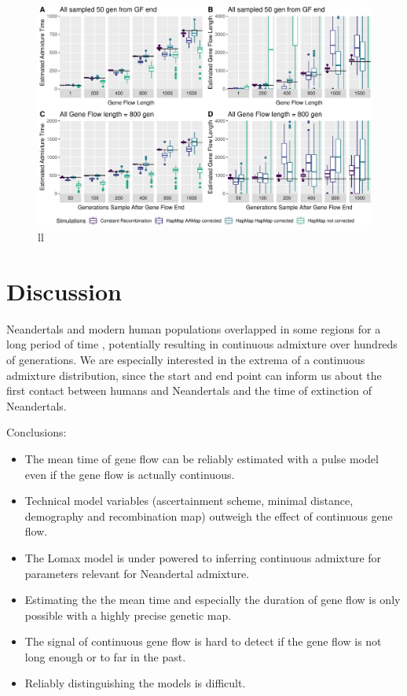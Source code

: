 \documentclass[]{article}
\begin{document}
\begin{figure}
\centering
\includegraphics{Admixture_Time_Inference_Paper_Draft_files/figure-latex/fig4-1.pdf}
\caption{\label{fig:fig4} ll}
\end{figure}

\section{Discussion}\label{discussion}

Neandertals and modern human populations overlapped in some regions for
a long period of time \citep{higham_timing_2014}, potentially resulting
in continuous admixture over hundreds of generations. We are especially
interested in the extrema of a continuous admixture distribution, since
the start and end point can inform us about the first contact between
humans and Neandertals and the time of extinction of Neandertals.

Conclusions:

\begin{itemize}
    \item The mean time of gene flow can be reliably estimated with a pulse model even if the gene flow is actually continuous.
  \item Technical model variables (ascertainment scheme, minimal distance, demography and recombination map) outweigh the effect of continuous gene flow.
  \item The Lomax model is under powered to inferring continuous admixture for parameters relevant for Neandertal admixture.
  \item Estimating the the mean time and especially the duration of gene flow is only possible with a highly precise genetic map.
  \item The signal of continuous gene flow is hard to detect if the gene flow is not long enough or to far in the past.
  \item Reliably distinguishing the models is difficult.
\end{itemize}
\end{document}
